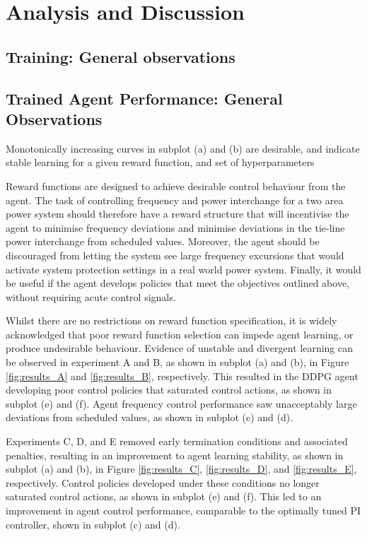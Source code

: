 \chapter{Analysis and Discussion}

\section{Training: General observations}

\section{Trained Agent Performance: General Observations}

Monotonically increasing curves in subplot (a) and (b) are desirable, and indicate stable learning for a given reward function, and set of hyperparameters

Reward functions are designed to achieve desirable control behaviour from the agent. The task of controlling frequency and power interchange for a two area power system should therefore have a reward structure that will incentivise the agent to minimise frequency deviations and minimise deviations in the tie-line power interchange from scheduled values. Moreover, the agent should be discouraged from letting the system see large frequency excursions that would activate system protection settings in a real world power system. Finally, it would be useful if the agent develops policies that meet the objectives outlined above, without requiring acute control signals.

Whilst there are no restrictions on reward function specification, it is widely acknowledged that poor reward function selection can impede agent learning, or produce undesirable behaviour. Evidence of unstable and divergent learning can be observed in experiment A and B, as shown in subplot (a) and (b), in Figure \ref{fig:results_A} and \ref{fig:results_B}, respectively. This resulted in the DDPG agent developing poor control policies that saturated control actions, as shown in subplot (e) and (f). Agent frequency control performance saw unacceptably large deviations from scheduled values, as shown in subplot (c) and (d).

Experiments C, D, and E removed early termination conditions and associated penalties, resulting in an improvement to agent learning stability, as shown in subplot (a) and (b), in Figure \ref{fig:results_C}, \ref{fig:results_D}, and \ref{fig:results_E}, respectively. Control policies developed under these conditions no longer saturated control actions, as shown in subplot (e) and (f). This led to an improvement in agent control performance, comparable to the optimally tuned PI controller, shown in subplot (c) and (d).


